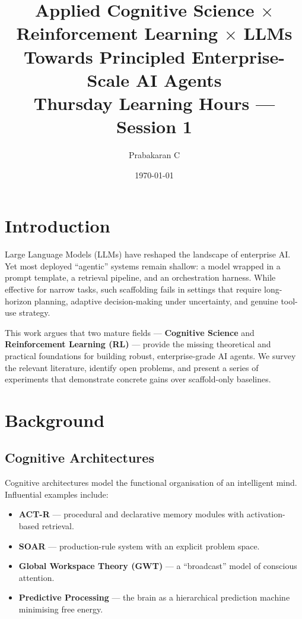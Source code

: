 \documentclass[12pt,a4paper]{article}
\title{%
  \textbf{Applied Cognitive Science $\times$ Reinforcement Learning $\times$ LLMs}\\[0.4em]
  \large Towards Principled Enterprise-Scale AI Agents\\[0.2em]
  \normalsize Thursday Learning Hours — Session 1
}
\author{Prabakaran C}
\date{\today}
\begin{document}
\maketitle
\tableofcontents
\newpage

\section{Introduction}

Large Language Models (LLMs) have reshaped the landscape of enterprise AI. Yet most deployed
``agentic'' systems remain shallow: a model wrapped in a prompt template, a retrieval pipeline,
and an orchestration harness. While effective for narrow tasks, such scaffolding fails in
settings that require long-horizon planning, adaptive decision-making under uncertainty, and
genuine tool-use strategy.

This work argues that two mature fields — \textbf{Cognitive Science} and
\textbf{Reinforcement Learning (RL)} — provide the missing theoretical and practical
foundations for building robust, enterprise-grade AI agents. We survey the relevant literature,
identify open problems, and present a series of experiments that demonstrate concrete gains
over scaffold-only baselines.

\section{Background}

\subsection{Cognitive Architectures}

Cognitive architectures model the functional organisation of an intelligent mind. Influential
examples include:

\begin{itemize}[noitemsep]
  \item \textbf{ACT-R} \citep{anderson2004integrated} — procedural and declarative memory modules
        with activation-based retrieval.
  \item \textbf{SOAR} \citep{laird2012soar} — production-rule system with an explicit problem space.
  \item \textbf{Global Workspace Theory (GWT)} \citep{baars1988cognitive} — a ``broadcast'' model of
        conscious attention.
  \item \textbf{Predictive Processing} \citep{clark2016surfing} — the brain as a hierarchical
        prediction machine minimising free energy.
\end{itemize}
\end{document}
